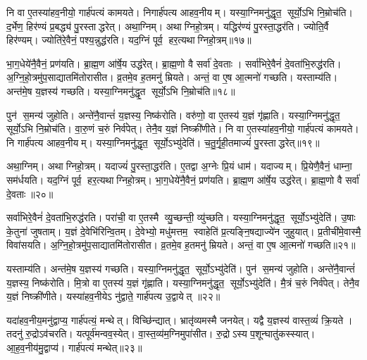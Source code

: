 नि वा ए॒तस्या॑हव॒नीयो॒ गार्\mbox{}ह॑पत्यं कामयते। निगार्\mbox{}ह॑पत्य आहव॒नीयम्। यस्या॒ग्निमनु॑द्धृत॒ सूर्यो॒ऽभि नि॒म्रोच॑ति। द॒र्भेण॒ हिर॑ण्यं प्र॒बद्ध्य॑ पु॒रस्ताद्धरेत्। अथा॒ग्निम्। अथाग्निहो॒त्रम्। यद्धिर॑ण्यं पु॒रस्ता॒द्धर॑ति। ज्योति॒र्वै हिर॑ण्यम्। ज्योति॑रे॒वैनं॒ पश्य॒न्नुद्ध॑रति। यद॒ग्निं पूर्व॒ हर॒त्यथाग्निहो॒त्रम्॥१७॥

भा॒ग॒धेये॑नै॒वैनं॒ प्रण॑यति। ब्रा॒ह्म॒ण आ॑र्\mbox{}षे॒य उद्ध॑रेत्। ब्रा॒ह्म॒णो वै सर्वा॑ दे॒वताः। सर्वा॑भिरे॒वैनं॑ दे॒वता॑भि॒रुद्ध॑रति। अ॒ग्नि॒हो॒त्रमु॑प॒साद्यातमि॑तोरासीत। व्र॒तमे॒व ह॒तमनु॑ म्रियते। अन्तं॒ वा ए॒ष आ॒त्मनो॑ गच्छति। यस्ताम्य॑ति। अन्त॑मे॒ष य॒ज्ञस्य॑ गच्छति। यस्या॒ग्निमनु॑द्धृ॒त सूर्यो॒ऽभि नि॒म्रोच॑ति॥१८॥

पुन॑ स॒मन्य॑ जुहोति। अन्ते॑नै॒वान्तं॑ य॒ज्ञस्य॒ निष्क॑रोति। वरु॑णो॒ वा ए॒तस्य॑ य॒ज्ञं गृ॑ह्णाति। यस्या॒ग्निमनु॑द्धृत॒ सूर्यो॒ऽभि नि॒म्रोच॑ति। वा॒रु॒णं च॒रुं निर्व॑पेत्। तेनै॒व य॒ज्ञं निष्क्री॑णीते। नि वा ए॒तस्या॑हव॒नीयो॒ गार्\mbox{}ह॑पत्यं कामयते। नि गार्\mbox{}ह॑पत्य आहव॒नीयम्। यस्या॒ग्निमनु॑द्धृत॒ सूर्यो॒ऽभ्यु॑देति॑। च॒तु॒र्गृ॒ही॒तमाज्यं॑ पु॒रस्ताद्धरेत्॥१९॥

अथा॒ग्निम्। अथाग्निहो॒त्रम्। यदाज्यं॑ पु॒रस्ता॒द्धर॑ति। ए॒तद्वा अ॒ग्नेः प्रि॒यं धाम॑। यदाज्यम्। प्रि॒येणै॒वैनं॒ धाम्ना॒ सम॑र्धयति। यद॒ग्निं पूर्व॒ हर॒त्यथाग्निहो॒त्रम्। भा॒ग॒धेये॑नै॒वैनं॒ प्रण॑यति। ब्रा॒ह्म॒ण आ॑र्\mbox{}षे॒य उद्ध॑रेत्। ब्रा॒ह्म॒णो वै सर्वा॑ दे॒वताः॥२०॥

सर्वा॑भिरे॒वैनं॑ दे॒वता॑भि॒रुद्ध॑रति। परा॑ची॒ वा ए॒तस्मै व्यु॒च्छन्ती॒ व्यु॑च्छति। यस्या॒ग्निमनु॑द्धृत॒ सूर्यो॒ऽभ्यु॑देति॑। उ॒षाः के॒तुना॑ जुषताम्। य॒ज्ञं दे॒वेभि॑रिन्वि॒तम्। दे॒वेभ्यो॒ मधु॑मत्तम॒ स्वाहेति॑ प्र॒त्यङ्नि॒षद्याज्ये॑न जुहुयात्। प्र॒तीची॑मे॒वास्मै॒ विवा॑सयति। अ॒ग्नि॒हो॒त्रमु॑प॒साद्यातमि॑तोरासीत। व्र॒तमे॒व ह॒तमनु॑ म्रियते। अन्तं॒ वा ए॒ष आ॒त्मनो॑ गच्छति॥२१॥

यस्ताम्य॑ति। अन्त॑मे॒ष य॒ज्ञस्य॑ गच्छति। यस्या॒ग्निमनु॑द्धृत॒ सूर्यो॒ऽभ्यु॑देति॑। पुन॑ स॒मन्य॑ जुहोति। अन्ते॑नै॒वान्तं॑ य॒ज्ञस्य॒ निष्क॑रोति। मि॒त्रो वा ए॒तस्य॑ य॒ज्ञं गृ॑ह्णाति। यस्या॒ग्निमनु॑द्धृत॒ सूर्यो॒ऽभ्यु॑देति॑। मै॒त्रं च॒रुं निर्व॑पेत्। तेनै॒व य॒ज्ञं निष्क्री॑णीते। यस्या॑हव॒नीयेऽ नु॑द्वाते॒ गार्\mbox{}ह॑पत्य उ॒द्वायेत् ॥२२॥

यदा॑हव॒नीय॒मनु॑द्वाप्य॒ गार्\mbox{}ह॑पत्यं॒ मन्थेत्। विच्छि॑न्द्यात्। भ्रातृ॑व्यमस्मै जनयेत्। यद्वै य॒ज्ञस्य॑ वास्त॒व्यं॑ क्रि॒यते। तदनु॑ रु॒द्रोऽव॑चरति। यत्पूर्व॑मन्वव॒स्येत्। वा॒स्त॒व्य॑म॒ग्निमुपा॑सीत। रु॒द्रोऽस्य प॒शून्घातु॑कस्स्यात्। आ॒ह॒व॒नीय॑मु॒द्वाप्य॑। गार्\mbox{}ह॑पत्यं मन्थेत्॥२३॥

